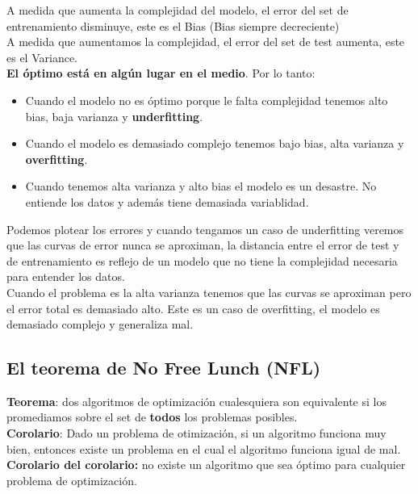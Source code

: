 \documentclass[titlepage,a4paper]{article}
\begin{document}
A medida que aumenta la complejidad del modelo, el error del set de entrenamiento disminuye, este es el Bias (Bias siempre decreciente) \\

A medida que aumentamos la complejidad, el error del set de test aumenta, este es el Variance.  \\

\textbf{El óptimo está en algún lugar en el medio}. 
Por lo tanto: 
\begin{itemize}
\item Cuando el modelo no es óptimo porque le falta complejidad tenemos alto bias, baja varianza y \textbf{underfitting}. 
\item Cuando el modelo es demasiado complejo tenemos bajo bias, alta varianza y \textbf{overfitting}.
\item Cuando tenemos alta varianza y alto bias el modelo es un desastre. No entiende los datos y además tiene demasiada variablidad. 
\end{itemize} 

Podemos plotear los errores y cuando tengamos un caso de underfitting veremos que las curvas de error nunca se aproximan, la distancia entre el error de test y de entrenamiento es reflejo de un modelo que no tiene la complejidad necesaria para entender los datos. \\

Cuando el problema es la alta varianza tenemos que las curvas se aproximan pero el error total es demasiado alto.  Este es un caso de overfitting, el modelo es demasiado complejo y generaliza mal.  

\subsection*{El teorema de No Free Lunch (NFL)} 

\textbf{Teorema}:  dos algoritmos de optimización cualesquiera son equivalente si los promediamos sobre el set de \textbf{todos} los problemas posibles. \\

\textbf{Corolario}: Dado un problema de otimización, si un algoritmo funciona muy bien, entonces existe un problema en el cual el algoritmo funciona igual de mal. \\

\textbf{Corolario del corolario: } no existe un algoritmo que sea óptimo para cualquier problema de optimización. \\
\end{document}

